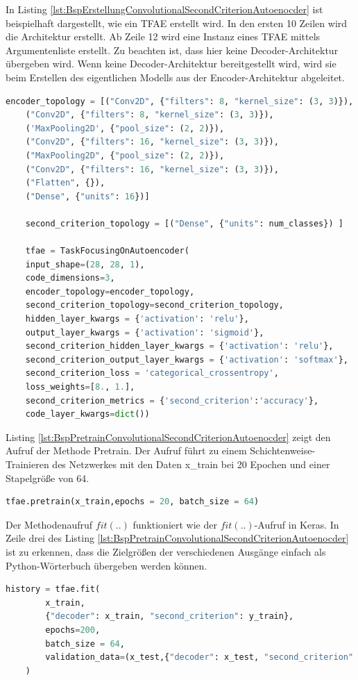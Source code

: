 	In Listing \ref{lst:BspErstellungConvolutionalSecondCriterionAutoenocder} ist beispielhaft dargestellt, wie ein TFAE erstellt wird. In den ersten 10 Zeilen wird die Architektur erstellt. Ab Zeile 12 wird eine Instanz eines TFAE mittels Argumentenliste erstellt. Zu beachten ist, dass hier keine Decoder-Architektur übergeben wird. Wenn keine Decoder-Architektur bereitgestellt wird, wird sie beim Erstellen des eigentlichen Modells aus der Encoder-Architektur abgeleitet.
	\begin{lstlisting}[language=python,caption=Beispiel Erstellung ConvolutionalSecondCriterionAutoenocder in Python, label=lst:BspErstellungConvolutionalSecondCriterionAutoenocder]
	encoder_topology = [("Conv2D", {"filters": 8, "kernel_size": (3, 3)}),
	("Conv2D", {"filters": 8, "kernel_size": (3, 3)}),
	('MaxPooling2D', {"pool_size": (2, 2)}),
	("Conv2D", {"filters": 16, "kernel_size": (3, 3)}),
	("MaxPooling2D", {"pool_size": (2, 2)}),
	("Conv2D", {"filters": 16, "kernel_size": (3, 3)}),
	("Flatten", {}),
	("Dense", {"units": 16})]

	second_criterion_topology = [("Dense", {"units": num_classes}) ]

	tfae = TaskFocusingOnAutoencoder(
	input_shape=(28, 28, 1),	
	code_dimensions=3, 
	encoder_topology=encoder_topology,
	second_criterion_topology=second_criterion_topology,
	hidden_layer_kwargs = {'activation': 'relu'},
	output_layer_kwargs = {'activation': 'sigmoid'},
	second_criterion_hidden_layer_kwargs = {'activation': 'relu'},
	second_criterion_output_layer_kwargs = {'activation': 'softmax'},
	second_criterion_loss = 'categorical_crossentropy',
	loss_weights=[8., 1.],
	second_criterion_metrics = {'second_criterion':'accuracy'},
	code_layer_kwargs=dict())
	\end{lstlisting}
	Listing  \ref{lst:BspPretrainConvolutionalSecondCriterionAutoenocder}  zeigt den Aufruf der Methode Pretrain. Der Aufruf führt zu einem Schichtenweise-Trainieren des Netzwerkes mit den Daten x\_train bei 20 Epochen und einer Stapelgröße von 64. 
	\begin{lstlisting}[language=python,caption=Beispielaufruf Pretrain  in Python, label=lst:BspPretrainConvolutionalSecondCriterionAutoenocder]
	tfae.pretrain(x_train,epochs = 20, batch_size = 64)
	\end{lstlisting}

	Der Methodenaufruf $fit(..)$ funktioniert wie der $fit(..)$-Aufruf in Keras. In Zeile drei des Listing  \ref{lst:BspPretrainConvolutionalSecondCriterionAutoenocder}  ist zu erkennen, dass die Zielgrößen der verschiedenen Ausgänge einfach als Python-Wörterbuch übergeben werden können.
	\begin{lstlisting}[language=python,caption=Beispielaufruf Fit  in Python, label=lst:BspFitConvolutionalSecondCriterionAutoenocder]
	history = tfae.fit(
		x_train,
		{"decoder": x_train, "second_criterion": y_train}, 
		epochs=200,
		batch_size = 64,
		validation_data=(x_test,{"decoder": x_test, "second_criterion": y_test})
	)
	\end{lstlisting}

